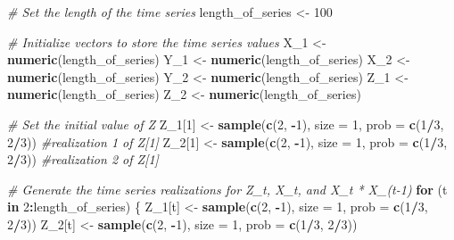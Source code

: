 \documentclass[
]{article}
\newenvironment{Shaded}{\begin{snugshade}}{\end{snugshade}}
\newcommand{\AttributeTok}[1]{\textcolor[rgb]{0.13,0.29,0.53}{#1}}
\newcommand{\CommentTok}[1]{\textcolor[rgb]{0.56,0.35,0.01}{\textit{#1}}}
\newcommand{\ControlFlowTok}[1]{\textcolor[rgb]{0.13,0.29,0.53}{\textbf{#1}}}
\newcommand{\DecValTok}[1]{\textcolor[rgb]{0.00,0.00,0.81}{#1}}
\newcommand{\FunctionTok}[1]{\textcolor[rgb]{0.13,0.29,0.53}{\textbf{#1}}}
\newcommand{\NormalTok}[1]{#1}
\newcommand{\OtherTok}[1]{\textcolor[rgb]{0.56,0.35,0.01}{#1}}
\newcommand{\SpecialCharTok}[1]{\textcolor[rgb]{0.81,0.36,0.00}{\textbf{#1}}}
\begin{document}
\begin{Shaded}
\begin{Highlighting}[]
\CommentTok{\# Set the length of the time series}
\NormalTok{length\_of\_series }\OtherTok{\textless{}{-}} \DecValTok{100}

\CommentTok{\# Initialize vectors to store the time series values}
\NormalTok{X\_1 }\OtherTok{\textless{}{-}} \FunctionTok{numeric}\NormalTok{(length\_of\_series)}
\NormalTok{Y\_1 }\OtherTok{\textless{}{-}} \FunctionTok{numeric}\NormalTok{(length\_of\_series)}
\NormalTok{X\_2 }\OtherTok{\textless{}{-}} \FunctionTok{numeric}\NormalTok{(length\_of\_series)}
\NormalTok{Y\_2 }\OtherTok{\textless{}{-}} \FunctionTok{numeric}\NormalTok{(length\_of\_series)}
\NormalTok{Z\_1 }\OtherTok{\textless{}{-}} \FunctionTok{numeric}\NormalTok{(length\_of\_series)}
\NormalTok{Z\_2 }\OtherTok{\textless{}{-}} \FunctionTok{numeric}\NormalTok{(length\_of\_series)}


\CommentTok{\# Set the initial value of Z}
\NormalTok{Z\_1[}\DecValTok{1}\NormalTok{] }\OtherTok{\textless{}{-}} \FunctionTok{sample}\NormalTok{(}\FunctionTok{c}\NormalTok{(}\DecValTok{2}\NormalTok{, }\SpecialCharTok{{-}}\DecValTok{1}\NormalTok{), }\AttributeTok{size =} \DecValTok{1}\NormalTok{, }\AttributeTok{prob =} \FunctionTok{c}\NormalTok{(}\DecValTok{1}\SpecialCharTok{/}\DecValTok{3}\NormalTok{, }\DecValTok{2}\SpecialCharTok{/}\DecValTok{3}\NormalTok{)) }\CommentTok{\#realization 1 of Z[1]}
\NormalTok{Z\_2[}\DecValTok{1}\NormalTok{] }\OtherTok{\textless{}{-}} \FunctionTok{sample}\NormalTok{(}\FunctionTok{c}\NormalTok{(}\DecValTok{2}\NormalTok{, }\SpecialCharTok{{-}}\DecValTok{1}\NormalTok{), }\AttributeTok{size =} \DecValTok{1}\NormalTok{, }\AttributeTok{prob =} \FunctionTok{c}\NormalTok{(}\DecValTok{1}\SpecialCharTok{/}\DecValTok{3}\NormalTok{, }\DecValTok{2}\SpecialCharTok{/}\DecValTok{3}\NormalTok{)) }\CommentTok{\#realization 2 of Z[1]}

\CommentTok{\# Generate the time series realizations for Z\_t, X\_t, and X\_t * X\_(t{-}1)}
\ControlFlowTok{for}\NormalTok{ (t }\ControlFlowTok{in} \DecValTok{2}\SpecialCharTok{:}\NormalTok{length\_of\_series) \{}
\NormalTok{  Z\_1[t] }\OtherTok{\textless{}{-}} \FunctionTok{sample}\NormalTok{(}\FunctionTok{c}\NormalTok{(}\DecValTok{2}\NormalTok{, }\SpecialCharTok{{-}}\DecValTok{1}\NormalTok{), }\AttributeTok{size =} \DecValTok{1}\NormalTok{, }\AttributeTok{prob =} \FunctionTok{c}\NormalTok{(}\DecValTok{1}\SpecialCharTok{/}\DecValTok{3}\NormalTok{, }\DecValTok{2}\SpecialCharTok{/}\DecValTok{3}\NormalTok{))}
\NormalTok{  Z\_2[t] }\OtherTok{\textless{}{-}} \FunctionTok{sample}\NormalTok{(}\FunctionTok{c}\NormalTok{(}\DecValTok{2}\NormalTok{, }\SpecialCharTok{{-}}\DecValTok{1}\NormalTok{), }\AttributeTok{size =} \DecValTok{1}\NormalTok{, }\AttributeTok{prob =} \FunctionTok{c}\NormalTok{(}\DecValTok{1}\SpecialCharTok{/}\DecValTok{3}\NormalTok{, }\DecValTok{2}\SpecialCharTok{/}\DecValTok{3}\NormalTok{))}
  

\end{Highlighting}
\end{Shaded}
\end{document}
